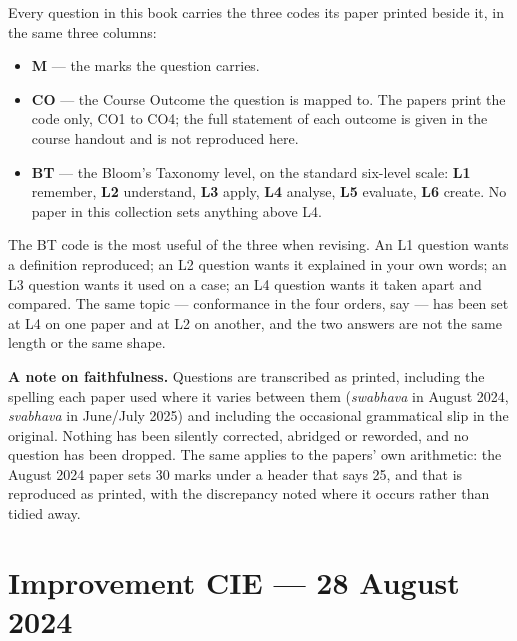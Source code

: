 \documentclass[11pt,a4paper,oneside]{book}
\newenvironment{note}
  {\begin{tcolorbox}[colback=tint,colframe=ocre,boxrule=0.8pt,sharp corners,
     fontupper=\small,breakable,before skip=8pt,after skip=8pt]}
  {\end{tcolorbox}}
\newenvironment{abul}
  {\begin{itemize}[leftmargin=1.5em,itemsep=2pt,topsep=3pt,parsep=0pt,
                   label=\textcolor{ocre}{\scriptsize$\blacksquare$}]}
  {\end{itemize}}
\begin{document}
Every question in this book carries the three codes its paper printed beside
it, in the same three columns:

\begin{abul}
\item \textbf{M} --- the marks the question carries.
\item \textbf{CO} --- the Course Outcome the question is mapped to. The papers
      print the code only, CO1 to CO4; the full statement of each outcome is
      given in the course handout and is not reproduced here.
\item \textbf{BT} --- the Bloom's Taxonomy level, on the standard six-level
      scale: \textbf{L1} remember, \textbf{L2} understand, \textbf{L3} apply,
      \textbf{L4} analyse, \textbf{L5} evaluate, \textbf{L6} create. No paper
      in this collection sets anything above L4.
\end{abul}

The BT code is the most useful of the three when revising. An L1 question wants
a definition reproduced; an L2 question wants it explained in your own words;
an L3 question wants it used on a case; an L4 question wants it taken apart and
compared. The same topic --- conformance in the four orders, say --- has been
set at L4 on one paper and at L2 on another, and the two answers are not the
same length or the same shape.

\begin{note}
\textbf{\sffamily A note on faithfulness.} Questions are transcribed as
printed, including the spelling each paper used where it varies between them
(\emph{swabhava} in August 2024, \emph{svabhava} in June/July 2025) and
including the occasional grammatical slip in the original. Nothing has been
silently corrected, abridged or reworded, and no question has been dropped.
The same applies to the papers' own arithmetic: the August 2024 paper sets 30
marks under a header that says 25, and that is reproduced as printed, with the
discrepancy noted where it occurs rather than tidied away.
\end{note}

\clearpage
\tableofcontents

\mainmatter
\pagestyle{fancy}

\chapter{Improvement CIE --- 28 August 2024}
\end{document}
